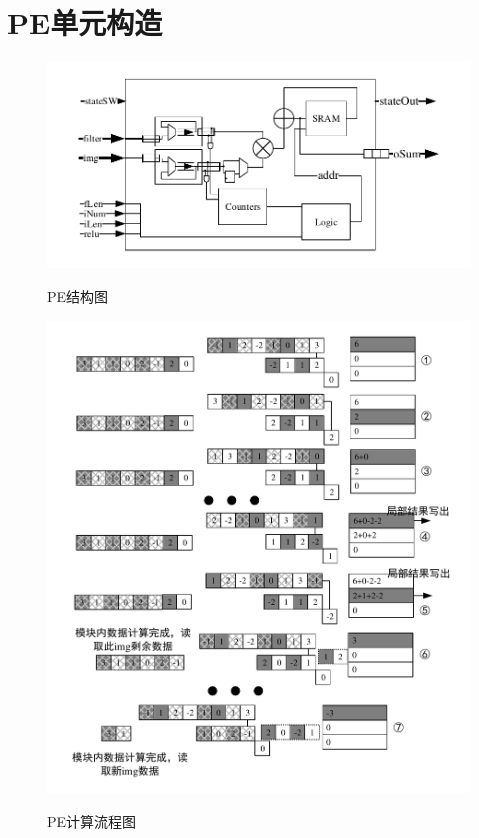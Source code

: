 
\section{PE单元构造}
\begin{figure}[h]
    \centering
    \includegraphics{../pdf/PE.pdf}\\
    \caption{PE结构图}
\end{figure}
\begin{figure}[h]
    \centering
    \includegraphics{../pdf/pe_cal.pdf}\\
    \caption{PE计算流程图}
    \label{pe_cal}
\end{figure}
